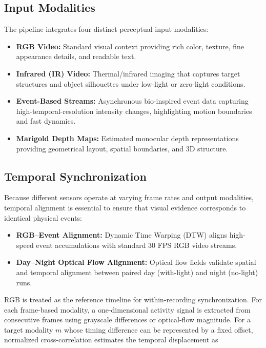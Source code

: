 \subsection{Input Modalities}

The pipeline integrates four distinct perceptual input modalities:
\begin{itemize}
    \item \textbf{RGB Video:} Standard visual context providing rich color, texture,
          fine appearance details, and readable text.
    \item \textbf{Infrared (IR) Video:} Thermal/infrared imaging that captures target
          structures and object silhouettes under low-light or zero-light conditions.
    \item \textbf{Event-Based Streams:} Asynchronous bio-inspired event data capturing
          high-temporal-resolution intensity changes, highlighting motion boundaries and fast dynamics.
    \item \textbf{Marigold Depth Maps:} Estimated monocular depth representations providing
          geometrical layout, spatial boundaries, and 3D structure.
\end{itemize}

\subsection{Temporal Synchronization}

Because different sensors operate at varying frame rates and output modalities,
temporal alignment is essential to ensure that visual evidence corresponds
to identical physical events:
\begin{itemize}
    \item \textbf{RGB--Event Alignment:} Dynamic Time Warping (DTW) aligns high-speed
          event accumulations with standard 30 FPS RGB video streams.
    \item \textbf{Day--Night Optical Flow Alignment:} Optical flow fields validate spatial
          and temporal alignment between paired day (with-light) and night (no-light) runs.
\end{itemize}

RGB is treated as the reference timeline for within-recording synchronization.
For each frame-based modality, a one-dimensional activity signal is extracted
from consecutive frames using grayscale differences or optical-flow magnitude.
For a target modality $m$ whose timing difference can be represented by a fixed
offset, normalized cross-correlation estimates the temporal displacement as

